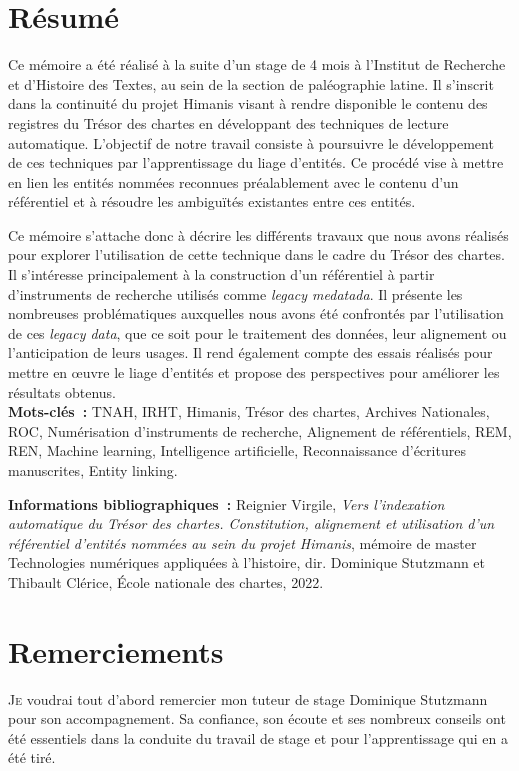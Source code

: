\documentclass[a4paper,12pt,twoside]{book}
\begin{document}
	\chapter{Résumé}
	\medskip
	Ce mémoire a été réalisé à la suite d'un stage de 4 mois à l'Institut de Recherche et d'Histoire des Textes, au sein de la section de paléographie latine. Il s'inscrit dans la continuité du projet Himanis visant à rendre disponible le contenu des registres du Trésor des chartes en développant des techniques de lecture automatique. L'objectif de notre travail consiste à poursuivre le développement de ces techniques par l'apprentissage du liage d'entités. Ce procédé vise à mettre en lien les entités nommées reconnues préalablement avec le contenu d'un référentiel et à résoudre les ambiguïtés existantes entre ces entités.
	
	Ce mémoire s'attache donc à décrire les différents travaux que nous avons réalisés pour explorer l'utilisation de cette technique dans le cadre du Trésor des chartes. Il s'intéresse principalement à la construction d'un référentiel à partir d'instruments de recherche utilisés comme \textit{legacy medatada}. Il présente les nombreuses problématiques auxquelles nous avons été confrontés par l'utilisation de ces \textit{legacy data}, que ce soit pour le traitement des données, leur alignement ou l'anticipation de leurs usages. Il rend également compte des essais réalisés pour mettre en œuvre le liage d'entités et propose des perspectives pour améliorer les résultats obtenus.\\
	
	\textbf{Mots-clés~:} TNAH, IRHT, Himanis, Trésor des chartes, Archives Nationales, ROC, Numérisation d'instruments de recherche, Alignement de référentiels, REM, REN, Machine learning, Intelligence artificielle, Reconnaissance d'écritures manuscrites, Entity linking.
	
	\textbf{Informations bibliographiques~:} Reignier Virgile, \textit{Vers l’indexation automatique du Trésor des chartes. Constitution, alignement et utilisation d'un référentiel d’entités nommées au sein du projet Himanis}, mémoire de master \og{}Technologies numériques appliquées à l'histoire\fg{}, dir. Dominique Stutzmann et Thibault Clérice, École nationale des chartes, 2022.
	
	\chapter{Remerciements}
	
	\lettrine{J}e voudrai tout d'abord remercier mon tuteur de stage Dominique Stutzmann pour son accompagnement. Sa confiance, son écoute et ses nombreux conseils ont été essentiels dans la conduite du travail de stage et pour l'apprentissage qui en a été tiré.
	
\end{document}
